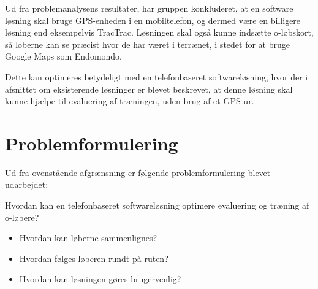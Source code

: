 Ud fra problemanalysens resultater, har gruppen konkluderet, at en software løsning skal bruge GPS-enheden i en mobiltelefon, og dermed være en billigere løsning end eksempelvis TracTrac. Løsningen skal også kunne indsætte o-løbskort, så løberne kan se præcist hvor de har været i terrænet, i stedet for at bruge Google Maps som Endomondo. 

Dette kan optimeres betydeligt med en telefonbaseret softwareløsning, hvor der i afsnittet om eksisterende løsninger er blevet beskrevet, at denne løsning skal kunne hjælpe til evaluering af træningen, uden brug af et GPS-ur.

\section{Problemformulering}
Ud fra ovenstående afgrænsning er følgende problemformulering blevet udarbejdet:

Hvordan kan en telefonbaseret softwareløsning optimere evaluering og træning af o-løbere?
\begin{itemize}
	\item Hvordan kan løberne sammenlignes?
	\item Hvordan følges løberen rundt på ruten?
	\item Hvordan kan løsningen gøres brugervenlig?
\end{itemize}